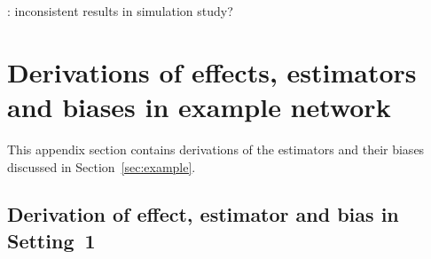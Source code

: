 \documentclass[10pt]{article}
\begin{document}
\todo: inconsistent results in simulation study?


\newpage


\begin{refcontext}[sorting=nyt]
\printbibliography
\end{refcontext}


\newpage

\appendix



\section{Derivations of effects, estimators and biases in example network}\label{apx:example}

This appendix section contains derivations of the estimators and their biases discussed in Section~\ref{sec:example}.

\subsection{Derivation of effect, estimator and bias in Setting~1} \label{apx:setting1}
\end{document}
